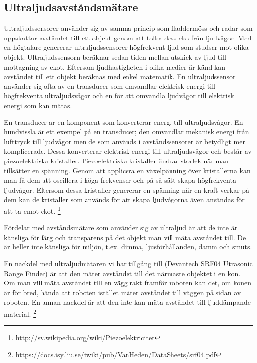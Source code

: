 \documentclass[a4paper,12pt,fleqn]{article}
\begin{document}
\subsection{Ultraljudsavståndsmätare}
Ultraljudssensorer använder sig av samma princip som fladdermöss och radar som uppskattar avståndet till ett objekt genom att tolka dess eko från ljudvågor. Med en högtalare genererar ultraljudssensorer högfrekvent ljud som studsar mot olika objekt. Ultraljudssensorn beräknar sedan tiden mellan utskick av ljud till mottagning av ekot. Eftersom ljudhastigheten i olika medier är känd kan avståndet till ett objekt beräknas med enkel matematik. En ultraljudssensor använder sig ofta av en transducer som omvandlar elektrisk energi till högfrekventa ultraljudsvågor och en för att omvandla ljudvågor till elektrisk energi som kan mätas.

En transducer är en komponent som konverterar energi till ultraljudsvågor. En hundvissla är ett exempel på en transducer; den omvandlar mekanisk energi från lufttryck till ljudvågor men de som används i avståndssensorer är betydligt mer komplicerade. Dessa konverterar elektrisk energi till ultraljudsvågor och består av piezoelektriska kristaller. Piezoelektriska kristaller ändrar storlek när man tillsätter en spänning. Genom att applicera en växelpänning över kristallerna kan man få dem att oscillera i höga frekvenser och på så sätt skapa högfrekventa ljudvågor. Eftersom dessa kristaller genererar en spänning när en kraft verkar på dem kan de kristaller som används för att skapa ljudvågorna även användas för att ta emot ekot.
\footnote{http://sv.wikipedia.org/wiki/Piezoelektricitet}

Fördelar med avståndsmätare som använder sig av ultraljud är att de inte är känsliga för färg och transparens på det objekt man vill mäta avståndet till. De är heller inte känsliga för miljön, t.ex. dimma, ljusförhållanden, damm och smuts.

En nackdel med ultraljudmätaren vi har tillgång till (Devantech SRF04 Utrasonic Range Finder) är att den mäter avståndet till det närmaste objektet i en kon. Om man vill mäta avståndet till en vägg rakt framför roboten kan det, om konen är för bred, hända att roboten istället mäter avståndet till väggen på sidan av roboten. En annan nackdel är att den inte kan mäta avståndet till ljuddämpande material.
\footnote{\url{https://docs.isy.liu.se/twiki/pub/VanHeden/DataSheets/srf04.pdf}}
\end{document}

